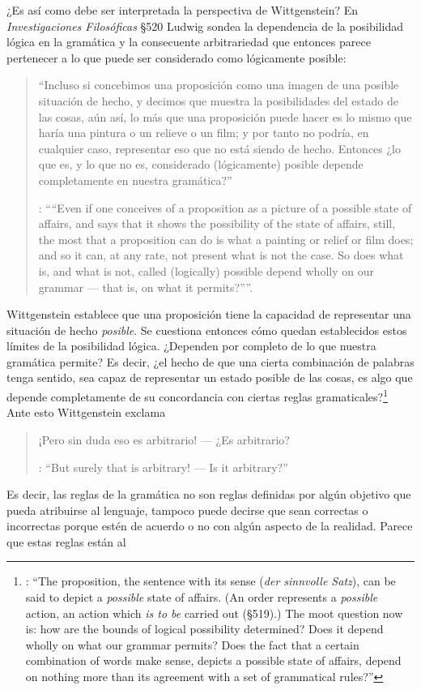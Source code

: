 ¿Es así como debe ser interpretada la perspectiva de Wittgenstein? En \emph{Investigaciones Filosóficas} \S520 Ludwig sondea la dependencia de la posibilidad lógica en la gramática y la consecuente arbitrariedad que entonces parece pertenecer a lo que puede ser considerado como lógicamente posible:
\blockquote[{\Cite[\S520]{wittgenstein1953phiinv}}: \enquote{``Even if one conceives of a proposition as a picture of a possible state of affairs, and says that it shows the possibility of the state of affairs, still, the most that a proposition can do is what a painting or relief or film does; and so it can, at any rate, not present what is not the case. So does what is, and what is not, called (logically) possible depend wholly on our grammar --- that is, on what it permits?''}.]{``Incluso si concebimos una proposición como una imagen de una posible situación de hecho, y decimos que muestra la posibilidades del estado de las cosas, aún así, lo más que una proposición puede hacer es lo mismo que haría una pintura o un relieve o un film; y por tanto no podría, en cualquier caso, representar eso que no está siendo de hecho. Entonces ¿lo que es, y lo que no es, considerado (lógicamente) posible depende completamente en nuestra gramática?''} Wittgenstein establece que una proposición tiene la capacidad de representar una situación de hecho \emph{posible}. Se cuestiona entonces cómo quedan establecidos estos límites de la posibilidad lógica. ¿Dependen por completo de lo que nuestra gramática permite? Es decir, ¿el hecho de que una cierta combinación de palabras tenga sentido, sea capaz de representar un estado posible de las cosas, es algo que depende completamente de su concordancia con ciertas reglas gramaticales?\footnote{\cite[Cf.][216]{hacker2000mind}: \enquote{The proposition, the sentence with its sense (\emph{der sinnvolle Satz}), can be said to depict a \emph{possible} state of affairs. (An order represents a \emph{possible} action, an action which \emph{is to be} carried out (\S519).) The moot question now is: how are the bounds of logical possibility determined? Does it depend wholly on what our grammar permits? Does the fact that a certain combination of words make sense, depicts a possible state of affairs, depend on nothing more than its agreement with a set of grammatical rules?}} Ante esto Wittgenstein exclama \blockquote[{\Cite[\S520]{wittgenstein1953phiinv}}: \enquote{But surely that is arbitrary! --- Is it arbitrary?}]{¡Pero sin duda eso es arbitrario! --- ¿Es arbitrario?}. Es decir, las reglas de la gramática no son reglas definidas por algún objetivo que pueda atribuirse al lenguaje, tampoco puede decirse que sean correctas o incorrectas porque estén de acuerdo o no con algún aspecto de la realidad. Parece que estas reglas están al 